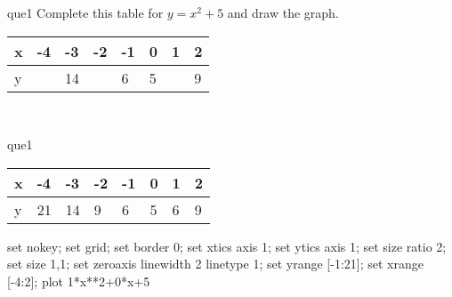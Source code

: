 \documentclass[13.5pt, varwidth=true]{beamer}
\begin{document}
\begin{frame}[shrink=19,fragile]
	\begin{beamercolorbox}[rounded=true, left, shadow=true,wd=14.8cm]{que1}
		 Complete this table for $y = x^{2} + 5$ and draw the graph. \\[0.3cm] \renewcommand{\arraystretch}{1.2}\begin{tabular}{|C|C|C|C|C|C|C|C|} \hline x & -4 & -3 & -2 & -1 & 0 & 1 & 2 \\ \hline y &  & 14 &  & 6 & 5 &  & 9\\ \hline \end{tabular}\\[0.3cm]
	\end{beamercolorbox}
\end{frame}
\begin{frame}[shrink=19,fragile]
	\begin{beamercolorbox}[rounded=true, left, shadow=true,wd=14.8cm]{que1}
		\renewcommand{\arraystretch}{1.2}\begin{tabular}{|C|C|C|C|C|C|C|C|} \hline x & -4 & -3 & -2 & -1 & 0 & 1 & 2 \\ \hline y & 21 & 14 & 9 & 6 & 5 & 6 & 9\\ \hline \end{tabular}\begin{gnuplot}[terminal=pdf] set nokey; set grid; set border 0; set xtics axis 1; set ytics axis 1; set size ratio 2; set size 1,1; set zeroaxis linewidth 2 linetype 1; set yrange [-1:21]; set xrange [-4:2]; plot 1*x**2+0*x+5 \end{gnuplot}
	\end{beamercolorbox}
\end{frame}
\end{document}
